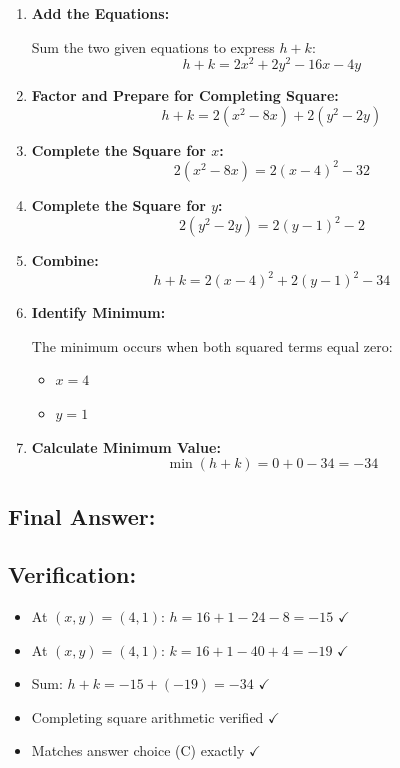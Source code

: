 \documentclass[12pt]{article}
\begin{document}
\begin{enumerate}
    \item \textbf{Add the Equations:} 
    
    Sum the two given equations to express $h + k$:
    \[h + k = 2x^2 + 2y^2 - 16x - 4y\]
    
    \item \textbf{Factor and Prepare for Completing Square:}
    \[h + k = 2(x^2 - 8x) + 2(y^2 - 2y)\]
    
    \item \textbf{Complete the Square for $x$:}
    \[2(x^2 - 8x) = 2(x - 4)^2 - 32\]
    
    \item \textbf{Complete the Square for $y$:}
    \[2(y^2 - 2y) = 2(y - 1)^2 - 2\]
    
    \item \textbf{Combine:}
    \[h + k = 2(x - 4)^2 + 2(y - 1)^2 - 34\]
    
    \item \textbf{Identify Minimum:}
    
    The minimum occurs when both squared terms equal zero:
    \begin{itemize}
        \item $x = 4$
        \item $y = 1$
    \end{itemize}
    
    \item \textbf{Calculate Minimum Value:}
    \[\min(h + k) = 0 + 0 - 34 = -34\]
\end{enumerate}

\subsection*{Final Answer:}

\begin{center}
\end{center}

\vspace{1em}

\subsection*{Verification:}
\begin{itemize}
    \item At $(x, y) = (4, 1)$: $h = 16 + 1 - 24 - 8 = -15$ $\checkmark$
    \item At $(x, y) = (4, 1)$: $k = 16 + 1 - 40 + 4 = -19$ $\checkmark$
    \item Sum: $h + k = -15 + (-19) = -34$ $\checkmark$
    \item Completing square arithmetic verified $\checkmark$
    \item Matches answer choice (C) exactly $\checkmark$
\end{itemize}
\end{document}

